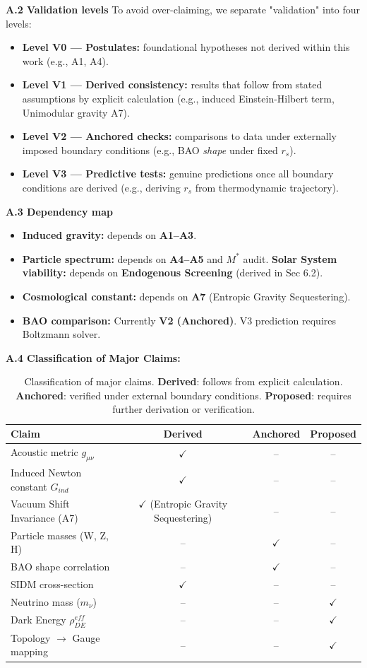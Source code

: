 \documentclass[a4paper,12pt]{article}
\begin{document}
\textbf{A.2 Validation levels}
To avoid over-claiming, we separate "validation" into four levels:
\begin{itemize}
    \item \textbf{Level V0 — Postulates:} foundational hypotheses not derived within this work (e.g., A1, A4).
    \item \textbf{Level V1 — Derived consistency:} results that follow from stated assumptions by explicit calculation (e.g., induced Einstein-Hilbert term, Unimodular gravity A7).
    \item \textbf{Level V2 — Anchored checks:} comparisons to data under externally imposed boundary conditions (e.g., BAO \emph{shape} under fixed $r_s$).
    \item \textbf{Level V3 — Predictive tests:} genuine predictions once all boundary conditions are derived (e.g., deriving $r_s$ from thermodynamic trajectory).
\end{itemize}

\textbf{A.3 Dependency map}
\begin{itemize}
    \item \textbf{Induced gravity:} depends on \textbf{A1--A3}.
    \item \textbf{Particle spectrum:} depends on \textbf{A4--A5} and $M^*$ audit.
    \textbf{Solar System viability:} depends on \textbf{Endogenous Screening} (derived in Sec 6.2).
    \item \textbf{Cosmological constant:} depends on \textbf{A7} (Entropic Gravity Sequestering).
    \item \textbf{BAO comparison:} Currently \textbf{V2 (Anchored)}. V3 prediction requires Boltzmann solver.
\end{itemize}

\textbf{A.4 Classification of Major Claims:}
\begin{table}[H]
\centering
\small
\begin{tabular}{lccc}
\toprule
\textbf{Claim} & \textbf{Derived} & \textbf{Anchored} & \textbf{Proposed} \\
\midrule
Acoustic metric $g_{\mu\nu}$ & $\checkmark$ & -- & -- \\
Induced Newton constant $G_{ind}$ & $\checkmark$ & -- & -- \\
Vacuum Shift Invariance (A7) & $\checkmark$ (Entropic Gravity Sequestering) & -- & -- \\
Particle masses (W, Z, H) & -- & $\checkmark$ & -- \\
BAO shape correlation & -- & $\checkmark$ & -- \\
SIDM cross-section & $\checkmark$ & -- & -- \\
Neutrino mass ($m_\nu$) & -- & -- & $\checkmark$ \\
Dark Energy $\rho_{DE}^{eff}$ & -- & -- & $\checkmark$ \\
Topology $\to$ Gauge mapping & -- & -- & $\checkmark$ \\
\bottomrule
\end{tabular}
\caption{Classification of major claims. \textbf{Derived}: follows from explicit calculation. \textbf{Anchored}: verified under external boundary conditions. \textbf{Proposed}: requires further derivation or verification.}
\end{table}
\end{document}
